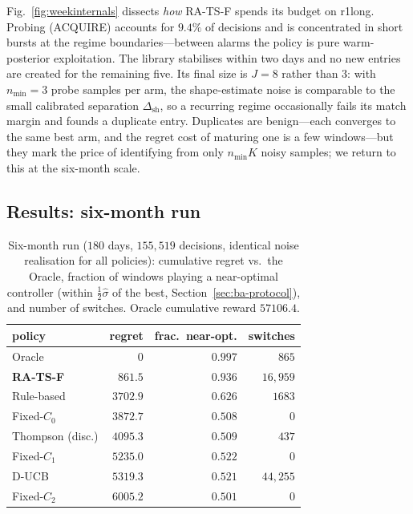 \documentclass[11pt,a4paper]{article}
\newcommand{\Cz}{C_{0}}
\newcommand{\Co}{C_{1}}
\newcommand{\Ct}{C_{2}}
\begin{document}
Fig.~\ref{fig:weekinternals} dissects \emph{how} RA-TS-F spends its budget on
r1long. Probing (ACQUIRE) accounts for $9.4\%$ of decisions and is concentrated
in short bursts at the regime boundaries---between alarms the policy is pure
warm-posterior exploitation. The library stabilises within two days and no new
entries are created for the remaining five. Its final size is $J=8$ rather
than $3$: with $n_{\min}=3$ probe samples per arm, the shape-estimate noise is
comparable to the small calibrated separation $\Delta_{\mathrm{sh}}$, so a
recurring regime occasionally fails its match margin and founds a duplicate
entry. Duplicates are benign---each converges to the same best arm, and the
regret cost of maturing one is a few windows---but they mark the price of
identifying from only $n_{\min}K$ noisy samples; we return to this at the
six-month scale.

\subsection{Results: six-month run}\label{sec:ba-sixmo}

\begin{table}[t]
  \centering
  \caption{Six-month run ($180$ days, $155{,}519$ decisions, identical noise
  realisation for all policies): cumulative regret vs.\ the Oracle, fraction of
  windows playing a near-optimal controller (within $\tfrac12\hat\sigma$ of the
  best, Section~\ref{sec:ba-protocol}), and number of switches. Oracle
  cumulative reward $57106.4$.}
  \label{tab:sixmo}
  \begin{tabular}{l r r r}
    \toprule
    policy & regret & frac.\ near-opt. & switches \\
    \midrule
    Oracle             & $0$      & $0.997$ & $865$ \\
    \textbf{RA-TS-F}   & $\mathbf{861.5}$ & $0.936$ & $16{,}959$ \\
    Rule-based         & $3702.9$ & $0.626$ & $1683$ \\
    Fixed-$\Cz$        & $3872.7$ & $0.508$ & $0$ \\
    Thompson (disc.)   & $4095.3$ & $0.509$ & $437$ \\
    Fixed-$\Co$        & $5235.0$ & $0.522$ & $0$ \\
    D-UCB              & $5319.3$ & $0.521$ & $44{,}255$ \\
    Fixed-$\Ct$        & $6005.2$ & $0.501$ & $0$ \\
    \bottomrule
  \end{tabular}
\end{table}
\end{document}
